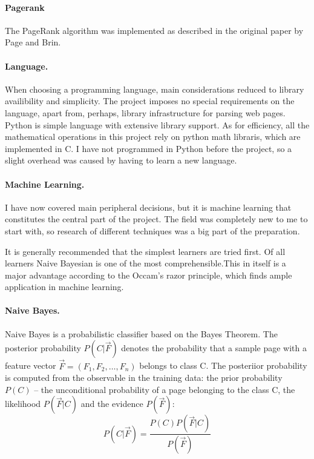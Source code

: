 \documentclass[12pt,twoside,notitlepage]{report}
\begin{document}
\paragraph{Pagerank} 
The PageRank algorithm was implemented as described in the original paper
by Page and Brin\cite{pagerank}.
\paragraph{Language.}

When choosing a programming language, main considerations reduced to library
availibility and simplicity. The project imposes no special  requirements on the
language, apart from, perhaps, library infrastructure for parsing web pages.
Python is simple language with extensive library support. As
for efficiency, all the mathematical operations in this project rely on python
math libraris, which are implemented in C. I have not programmed in Python
before the project, so a slight overhead was caused by having to learn a new
language.

\paragraph{Machine Learning.}

I have now covered main peripheral decisions, but it is machine learning that
constitutes the central part of the project. The field was completely new to me
to start with, so research of different techniques was a big part of the
preparation.

It is generally recommended that the simplest learners are tried
first\cite{domingos}. Of all learners Naive Bayesian is one of the most
comprehensible.This in itself is a major advantage according to the Occam's
razor principle, which finds ample application in machine learning.

\paragraph{Naive Bayes.}Naive Bayes is a probabilistic classifier based on the Bayes Theorem. The
posterior probability \(P(C|\vec{F})\) denotes the probability that a sample
page with a feature vector \(\vec{F}=(F_1,F_2,\dots,F_n)\) belongs to class C.
The posteriior probability is computed from the observable in the training data: the prior
probability \(P(C)\) -- the unconditional probability of a page belonging to
the class C, the likelihood \(P(\vec{F}|C)\) and the evidence \(P(\vec{F})\):
\begin{equation}
P(C|\vec{F}) = \frac{P(C)P(\vec{F}|C)}{P(\vec{F})}
\end{equation}
\end{document}
